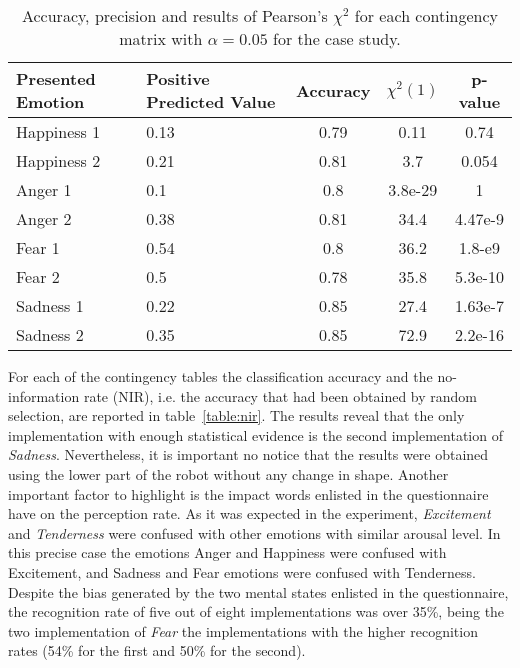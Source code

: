 \clearpage
\begin{table*}
\centering
\caption{Accuracy, precision and results of Pearson's $\chi^2$ for each contingency matrix with $\alpha = 0.05$ for the case study.} 
\label{table:Precision2}
		\begin{tabular}{|p{3 cm}|p{2 cm}|c|c|c|}
		\hline
		\textbf{Presented Emotion} & \textbf{Positive Predicted Value} & \textbf{Accuracy} & \textbf{$\chi^2(1)$} & \textbf{p-value}\\
		\hline
		Happiness 1 & 0.13 & 0.79 & 0.11 & 0.74\\
		\hline
		Happiness 2 & 0.21 & 0.81& 3.7 &0.054\\
		\hline
		Anger 1 & 0.1 & 0.8 & 3.8e-29 & 1\\
		\hline
		Anger 2 & 0.38 & 0.81 & 34.4 & 4.47e-9\\
		\hline
		Fear 1 & 0.54 & 0.8 & 36.2 & 1.8-e9\\
		\hline 
		Fear 2 & 0.5 & 0.78 & 35.8 & 5.3e-10\\
		\hline
		Sadness 1 & 0.22 & 0.85 & 27.4 & 1.63e-7\\
		\hline
		Sadness 2 & 0.35 & 0.85 & 72.9 & 2.2e-16\\		 
		\hline
			\end{tabular}
\end{table*}  

 For each of the contingency tables the classification accuracy and the no-information rate (NIR), i.e. the accuracy that had been obtained by random selection, are reported in table~\ref{table:nir}. The results reveal that the only implementation with enough statistical evidence is the second implementation of \textit{Sadness}. 
Nevertheless, it is important no notice that the results were obtained using the lower part of the robot without any change in shape. Another important factor to highlight is the impact words enlisted in the questionnaire have on the perception rate. As it was expected in the experiment, \textit{Excitement} and \textit{Tenderness} were confused with other emotions with similar arousal level. In this precise case the emotions Anger and Happiness were confused with Excitement, and Sadness and Fear emotions were confused with Tenderness. Despite the bias generated by the two mental states enlisted in the questionnaire, the recognition rate of five out of eight implementations was over 35\%, being the two implementation of \textit{Fear} the implementations with the higher recognition rates (54\% for the first and 50\% for the second).

